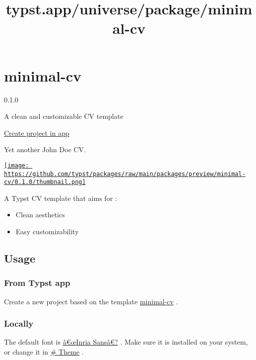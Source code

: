 \title{typst.app/universe/package/minimal-cv}

\label{banner}
\label{template-thumbnail}

\section{minimal-cv}\label{minimal-cv}

{ 0.1.0 }

A clean and customizable CV template

\href{/app?template=minimal-cv&version=0.1.0}{Create project in app}

\label{readme}
Yet another John Doe CV.

\href{https://github.com/typst/packages/raw/main/packages/preview/minimal-cv/0.1.0/thumbnail.png}{\texttt{[image: https://github.com/typst/packages/raw/main/packages/preview/minimal-cv/0.1.0/thumbnail.png]}}

A Typst CV template that aims for :

\begin{itemize}
\tightlist
\item
  Clean aesthetics
\item
  Easy customizability
\end{itemize}

\subsection{Usage}\label{usage}

\subsubsection{From Typst app}\label{from-typst-app}

Create a new project based on the template
\href{https://typst.app/universe/package/minimal-cv}{minimal-cv} .

\subsubsection{Locally}\label{locally}

The default font is
\href{https://fonts.google.com/specimen/Inria+Sans}{â€œInria Sansâ€?} .
Make sure it is installed on your system, or change it in
\href{https://github.com/typst/packages/raw/main/packages/preview/minimal-cv/0.1.0/\#theme}{\#
Theme} .

